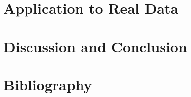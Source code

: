 \documentclass[12pt]{article}
\begin{document}
\section{Application to Real Data}


%

\section{Discussion and Conclusion}


\section{Bibliography}
\end{document}
